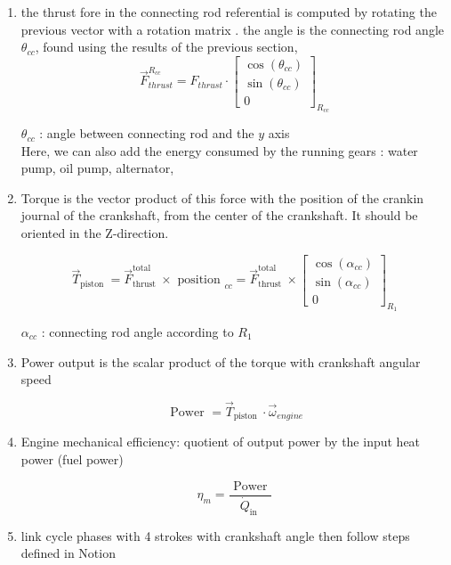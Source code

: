 \documentclass[12pt,a4paper]{article}
\begin{document}
\begin{enumerate}
		\item the thrust fore in the connecting rod referential is computed by rotating the previous vector with a rotation matrix . 
		the angle is the connecting rod angle $\theta_{cc}$, found using the results of the previous section, 
	\[
	\vec{F}_{thrust}^{R_{c c}}=F_{thrust} \cdot\left[\begin{array}{c}
		\cos \left(\theta_{c c}\right)  \tag{5}\\
		\sin \left(\theta_{c c}\right) \\
		0
	\end{array}\right]_{R_{c c}}
	\]
	
	$\theta_{c c}$ : angle between connecting rod and the $y$ axis\\
	
		
		Here, we can also add the energy consumed by the running gears : water pump, oil pump, alternator,\\
		
		\item Torque is the vector product of this force with the position of the crankin journal of the crankshaft,  from the center of the crankshaft. It should be oriented in the Z-direction.
		
		\[
		\vec{T}_{\text {piston }}=\vec{F}_{\text {thrust }}^{\text {total }} \times \text { position }_{c c}=\vec{F}_{\text {thrust }}^{\text {total }} \times\left[\begin{array}{c}
			\cos \left(\alpha_{c c}\right)  \tag{7}\\
			\sin \left(\alpha_{c c}\right) \\
			0
		\end{array}\right]_{R_{1}}
		\]
		
		$\alpha_{c c}$ : connecting rod angle according to $R_{1}$\\
		
		\item Power output is the scalar product of the torque with crankshaft angular speed
		
		
		\begin{equation*}
			\text { Power }=\vec{T}_{\text {piston }} \cdot \vec{\omega}_{engine} \tag{8}
		\end{equation*}
		
		\item Engine mechanical efficiency: quotient of output power by the input heat power (fuel power)
		
		\begin{equation*}
			\eta_{m}=\frac{\text { Power }}{\dot{Q}_{\text {in }}} \tag{9}
		\end{equation*}
		\item link cycle phases with 4 strokes with crankshaft angle
		then follow steps defined in Notion
		
	
	\end{enumerate}
\end{document}
